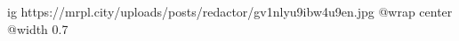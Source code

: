 
 
 
 
 

\ifcmt
  ig https://mrpl.city/uploads/posts/redactor/gv1nlyu9ibw4u9en.jpg
  @wrap center
  @width 0.7
\fi

